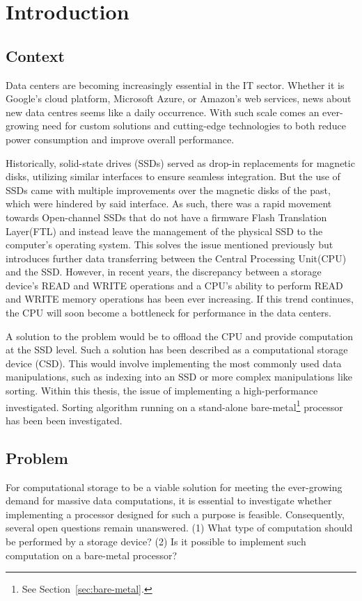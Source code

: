 \section{Introduction}
\subsection{Context}\label{sec:context}
Data centers are becoming increasingly essential in the IT sector. Whether it is
Google's cloud platform, Microsoft Azure, or Amazon's web services, news about
new data centres seems like a daily occurrence. With such scale comes an
ever-growing need for custom solutions and cutting-edge technologies to both
reduce power consumption and improve overall performance.

Historically, solid-state drives (SSDs) served as drop-in replacements for
magnetic disks, utilizing similar interfaces to ensure seamless integration. But
the use of SSDs came with multiple improvements over the magnetic disks of the
past, which were hindered by said interface. As such, there was a rapid movement
towards Open-channel SSDs that do not have a firmware Flash Translation
Layer(FTL) and instead leave the management of the physical SSD to the
computer's operating system. This solves the issue mentioned previously but
introduces further data transferring between the Central Processing Unit(CPU)
and the SSD. However, in recent years, the discrepancy between a storage
device's READ and WRITE operations and a CPU's ability to perform READ and WRITE
memory operations has been ever increasing. If this trend continues, the CPU
will soon become a bottleneck for performance in the data centers.

A solution to the problem would be to offload the CPU and provide computation at
the SSD level. Such a solution has been described as a computational storage
device (CSD). This would involve implementing the most commonly used data
manipulations, such as indexing into an SSD or more complex manipulations like
sorting. Within this thesis, the issue of implementing a high-performance
investigated. Sorting algorithm running on a stand-alone
bare-metal\footnote{\label{note:1}See Section~\ref{sec:bare-metal}.} processor
has been been investigated.


\subsection{Problem}\label{sec:problem}
For computational storage to be a viable solution for meeting the ever-growing
demand for massive data computations, it is essential to investigate whether
implementing a processor designed for such a purpose is feasible. Consequently,
several open questions remain unanswered. (1) What type of computation should be
performed by a storage device? (2) Is it possible to implement such computation
on a bare-metal processor?

